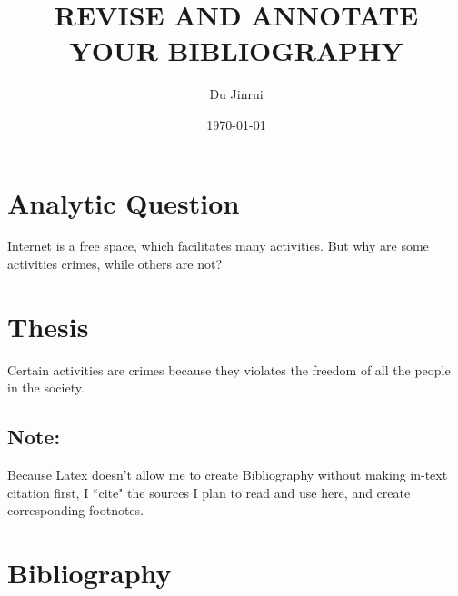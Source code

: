 \documentclass{article}
\title{REVISE AND ANNOTATE YOUR BIBLIOGRAPHY}
\author{Du Jinrui}
\date{\today}
\begin{document}
\maketitle

\section*{Analytic Question}
Internet is a free space, which facilitates many activities. But why are some activities crimes, while others are not?

\section*{Thesis}
Certain activities are crimes because they violates the freedom of all the people in the society.

\subsection*{Note:}
Because Latex doesn't allow me to create Bibliography without making in-text citation first, I ``cite" the sources I plan to read and use here,
\autocite{kant_2000}
\autocite{Walsh2014}
\autocite{Holt2022}
\autocite{Vogt2021}
and create corresponding footnotes.

\section*{Bibliography}
\printbibliography[heading=none]
\end{document}
